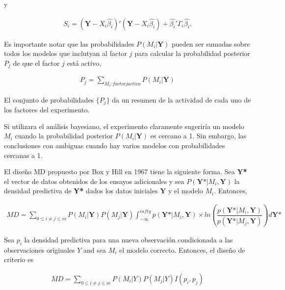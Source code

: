 y 

\begin{equation*}
	\begin{aligned}
		S_i = (\textbf{Y} - X_i \hat{\beta_i})' (\textbf{Y} - X_i \hat{\beta_i}) + \hat{\beta_i}' \Gamma_i \hat{\beta_i}.
	\end{aligned}
\end{equation*}

Es importante notar que las probabilidades $P(M_i | \textbf{Y})$ pueden ser sumadas sobre todos los modelos que inclutyan al factor $j$ para calcular la probabilidad posterior $P_j$ de que el factor $j$ está activo, 

\begin{equation*}
	\begin{aligned}
		P_j = \sum_{M_i:factorjactivo} P(M_i | \textbf{Y})
	\end{aligned}
\end{equation*}

El conjunto de probabilidades $\{ P_j \}$ da un resumen de la actividad de cada uno de los factores del experimento. 

Si utilizara el análisis bayesiano, el experimento claramente sugeriría un modelo $M_i$ cuando la probabilidad posterior $P(M_i | \textbf{Y})$ es cercano a 1. Sin embargo, las conclusiones con ambiguas cuando hay varios modelos con probabilidades cercanas a 1. 

El diseño MD propuesto por Box y Hill en 1967 \cite{hillybox1967}  tiene la siguiente forma. Sea \textbf{Y*} el vector de datos obtenidos de los ensayos adicionales y sea $P(\textbf{Y*} | M_i, \textbf{Y})$ la densidad predictiva de \textbf{Y*} dados los datos iniciales $\textbf{Y}$ y el modelo $M_i$. Entonces, 

\begin{equation*}
	\begin{aligned}
		MD = \sum_{0 \leq i \neq j \leq m} P(M_i | \textbf{Y}) P(M_j | \textbf{Y}) \int_{-\infty}^{infty} p(\textbf{Y*} | M_i, \textbf{Y}) \times ln(\dfrac{p(\textbf{Y*} | M_i, \textbf{Y})}{p(\textbf{Y*} | M_j, \textbf{Y})}) d\textbf{Y*}
	\end{aligned}
\end{equation*}

Sea $p_i$ la densidad predictiva para una nueva observación condicionada a las observaciones originales $Y$ and sea $M_i$ el modelo correcto. Entonces, el diseño de criterio es 

\begin{equation*}
	\begin{aligned}
		MD = \sum_{0 \leq i \neq j \leq m} P(M_i | Y)  P(M_j | Y) I(p_i, p_j)
	\end{aligned}
\end{equation*}

